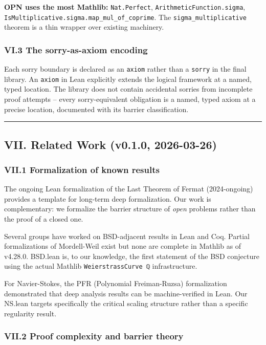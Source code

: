 \documentclass[12pt,a4paper]{article}
\begin{document}
\textbf{OPN uses the most Mathlib:} \texttt{Nat.Perfect}, \texttt{ArithmeticFunction.sigma}, \texttt{IsMultiplicative.sigma.map\_mul\_of\_coprime}. The \texttt{sigma\_multiplicative} theorem is a thin wrapper over existing machinery.

\subsubsection{VI.3 The sorry-as-axiom encoding}

Each sorry boundary is declared as an \texttt{axiom} rather than a \texttt{sorry} in the final library. An \texttt{axiom} in Lean explicitly extends the logical framework at a named, typed location. The library does not contain accidental sorries from incomplete proof attempts  --  every sorry-equivalent obligation is a named, typed axiom at a precise location, documented with its barrier classification.

\begin{center}
\rule{0.5\textwidth}{0.4pt}
\end{center}

\subsection{VII. Related Work (v0.1.0, 2026-03-26)}

\subsubsection{VII.1 Formalization of known results}

The ongoing Lean formalization of the Last Theorem of Fermat (2024-ongoing) provides a template for long-term deep formalization. Our work is complementary: we formalize the barrier structure of \emph{open} problems rather than the proof of a closed one.

Several groups have worked on BSD-adjacent results in Lean and Coq. Partial formalizations of Mordell-Weil exist but none are complete in Mathlib as of v4.28.0. BSD.lean is, to our knowledge, the first statement of the BSD conjecture using the actual Mathlib \texttt{WeierstrassCurve ℚ} infrastructure.

For Navier-Stokes, the PFR (Polynomial Freiman-Ruzsa) formalization demonstrated that deep analysis results can be machine-verified in Lean. Our NS.lean targets specifically the critical scaling structure rather than a specific regularity result.

\subsubsection{VII.2 Proof complexity and barrier theory}
\end{document}
